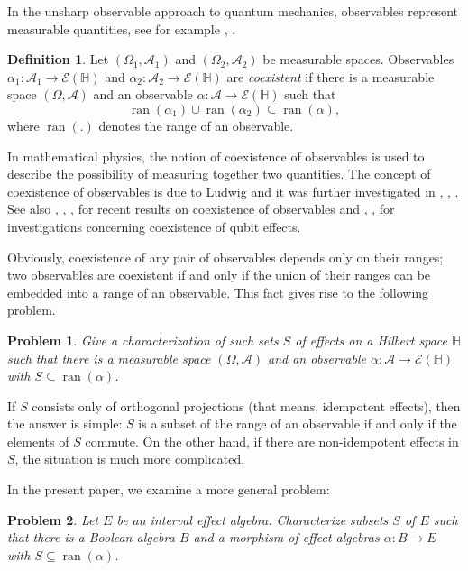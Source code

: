 \documentclass[letterpaper]{amsart}
\newtheorem{problem}{Problem}
\theoremstyle{definition}
\newtheorem{definition}{Definition}
\DeclareMathOperator*\ran{ran}
\begin{document}
In the unsharp observable approach to quantum mechanics, 
observables represent measurable quantities,
see for example \cite{BusLahMit:TQToM}, \cite{BusGraLah:OQP}.

\begin{definition}
Let $(\Omega_1,\mathcal A_1)$ and $(\Omega_2,\mathcal A_2)$ be measurable spaces.
Observables $\alpha_1:\mathcal A_1\to \mathcal E(\mathbb H)$ and
$\alpha_2:\mathcal A_2\to \mathcal E(\mathbb H)$ are {\em coexistent} if there is
a measurable space $(\Omega,\mathcal A)$ and an observable 
$\alpha:\mathcal A\to \mathcal E(\mathbb H)$ such that
$$
\ran(\alpha_1)\cup\ran(\alpha_2)\subseteq\ran(\alpha),
$$
where $\ran(.)$ denotes the range of an observable.
\end{definition}

In mathematical physics, the notion of coexistence of observables 
is used to describe 
the possibility of measuring together two quantities. The concept
of coexistence of observables is due to Ludwig \cite{Lud:VeaGdQuapT} and it was
further investigated in \cite{Hel:Ceiqm}, \cite{Kra:SEaO}, \cite{Lud:FoQM}.
See also \cite{LahPul:COaEiQM}, \cite{LahPulYli:COaEiCA}, \cite{LahPul:CvFCoQO},
\cite{Pul:CaDoE} for recent results on coexistence of observables
and \cite{Gud:CoQE}, \cite{BusSch:CoQE}, \cite{StaReiHeiZim:CoQE}
for investigations concerning coexistence of qubit effects.

Obviously, coexistence of any pair of observables depends only on their
ranges; two observables are coexistent if and only if the union of their ranges can be
embedded into a range of an observable. This fact gives rise to the following
problem.

\begin{problem}
Give a characterization of such sets $S$ 
of effects on a Hilbert space $\mathbb H$ such that
there is a measurable space $(\Omega,\mathcal A)$ and an observable 
$\alpha:\mathcal A\to\mathcal E(\mathbb H)$ with
$S\subseteq\ran(\alpha)$.
\end{problem}

If $S$ consists only of orthogonal projections (that means, idempotent effects),
then the answer is simple: $S$ is
a subset of the range of an observable if and only if the elements of $S$ commute.
On the other hand, if there are non-idempotent effects in $S$, the situation
is much more complicated. 

In the present paper, we examine a more general problem: 
\begin{problem}
Let $E$ be an interval effect algebra.
Characterize subsets $S$ of $E$ 
such that there is a Boolean algebra $B$ and a morphism of effect algebras 
$\alpha:B\to E$ with
$S\subseteq\ran(\alpha)$.
\end{problem}
\end{document}
